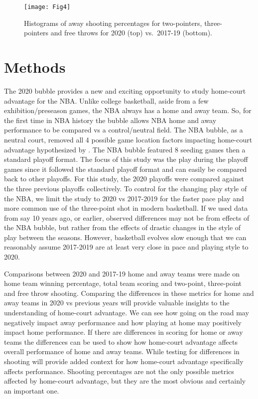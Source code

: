 \documentclass[12pt, letterpaper, titlepage]{article}
\begin{document}
\begin{figure}
  \centering
  \texttt{[image: Fig4]}
  \caption{Histograms of away shooting percentages for two-pointers,
    three-pointers and free throws for 2020 (top) vs.~2017-19
    (bottom).}
  \label{fig:Fig4}  
\end{figure}

\hypertarget{sec:methods}{%
\section{Methods}\label{sec:methods}}

The 2020 bubble provides a new and exciting opportunity to study home-court
advantage for the NBA. Unlike college basketball, aside from a few
exhibition/preseason games, the NBA always has a home and away team. So, for
the first time in NBA history the bubble allows NBA home and away performance
to be compared vs a control/neutral field. The NBA bubble, as a neutral court,
removed all 4 possible game location factors impacting home-court advantage
hypothesized by \citet{Carron1992}. The NBA bubble featured 8 seeding games then a
standard playoff format. The focus of this study was the play during the playoff
games since it followed the standard playoff format and can easily be compared
back to other playoffs. For this study, the 2020 playoffs were compared against
the three previous playoffs collectively. To control
for the changing play style of the NBA, we limit the study to 2020 vs 2017-2019
for the faster pace play and more common use of the three-point shot
in modern basketball. If we used data from say 10 years ago, or earlier, observed
differences may not be from effects of the NBA bubble, but rather from the effects
of drastic changes in the style of play between the seasons. However, basketball
evolves slow enough that we can reasonably assume 2017-2019 are at least very
close in pace and playing style to 2020.

Comparisons between 2020 and 2017-19 home and away teams were made on home team
winning percentage, total team scoring and two-point, three-point and free throw
shooting. Comparing the differences in these metrics for home and away teams in
2020 vs previous years will provide valuable insights to the understanding of
home-court advantage. We can see how going on the road may negatively impact
away performance and how playing at home may positively impact home performance.
If there are differences in scoring for home or away teams the differences can
be used to show how home-court advantage affects overall performance of home
and away teams. While testing for differences in shooting will provide added
context for how home-court advantage specifically affects performance.
Shooting percentages are not the only possible metrics affected by home-court
advantage, but they are the most obvious and certainly an important one.
\end{document}
